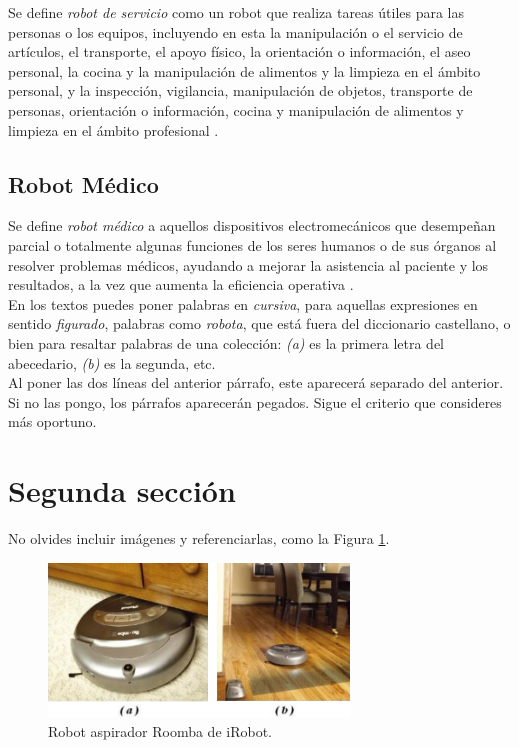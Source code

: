Se define \textit{robot de servicio} como un robot que realiza tareas útiles para las personas o los equipos, incluyendo en esta la manipulación o el servicio de artículos, el transporte, el apoyo físico, la orientación o información, el aseo personal, la cocina y la manipulación de alimentos y la limpieza en el ámbito personal, y la inspección, vigilancia, manipulación de objetos, transporte de personas, orientación o información, cocina y manipulación de alimentos y limpieza en el ámbito profesional \cite{ISO8373}.
 

\subsection{Robot Médico}
\label{sec:robotica_industrial} 

Se define \textit{robot médico} a aquellos dispositivos electromecánicos que desempeñan parcial o totalmente algunas funciones de los seres humanos o de sus órganos al resolver problemas médicos, ayudando a mejorar la asistencia al paciente y los resultados, a la vez que aumenta la eficiencia operativa \cite{Kraevsky10}.\\

En los textos puedes poner palabras en \textit{cursiva}, para aquellas expresiones en sentido \textit{figurado}, palabras como \textit{robota}, que está fuera del diccionario castellano, o bien para resaltar palabras de una colección: \textit{(a)} es la primera letra del abecedario, \textit{(b)} es la segunda, etc.\\

Al poner las dos líneas del anterior párrafo, este aparecerá separado del anterior. Si no las pongo, los párrafos aparecerán pegados. Sigue el criterio que consideres más oportuno.

\section{Segunda sección}
\label{sec:segundaseccion}

No olvides incluir imágenes y referenciarlas, como la Figura \ref{fig:roomba}.

\begin{figure} [h!]
  \begin{center}
    \includegraphics[width=8cm]{figs/roomba}
  \end{center}
  \caption{Robot aspirador Roomba de iRobot.}
  \label{fig:roomba}
\end{figure}\

